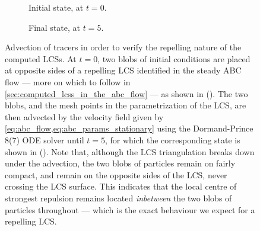 \begin{figure}[htpb]
    \centering
    \hspace*{\fill}
    \begin{subfigure}[b]{0.43\textwidth}
        \centering
        \caption[]{{\small Initial state, at $t=0$.}}
        \label{fig:blobtest-pre}
    \end{subfigure}\hfill%
    \begin{subfigure}[b]{0.43\textwidth}
        \centering
        \caption[]{{\small Final state, at $t=5$.}}
        \label{fig:blobtest-post}
    \end{subfigure}%
    \hspace*{\fill}
    \caption[Advection of tracers in order to verify the repelling nature of
    the computed \newline{}LCSs]
    {%
        Advection of tracers in order to verify the repelling nature of the
        computed LCSs. At $t=0$, two blobs of initial conditions are placed
        at opposite sides of a repelling LCS identified in the
        steady ABC flow --- more on which to follow in
        \cref{sec:computed_lcss_in_the_abc_flow} --- as shown in
        (). The two blobs, and the mesh points in
        the parametrization of the LCS, are then advected by the velocity
        field given by \cref{eq:abc_flow,eq:abc_params_stationary} using the
        Dormand-Prince 8(7) ODE solver until $t=5$, for which the corresponding
        state is shown in (). Note that, although
        the LCS triangulation breaks down under the advection, the two blobs
        of particles remain on fairly compact, and remain on the opposite
        sides of the LCS, never crossing the LCS surface. This indicates
        that the local centre of strongest repulsion remains located
        \emph{inbetween} the two blobs of particles throughout --- which
        is the exact behaviour we expect for a repelling LCS.
    }
    \label{fig:blobtest}
\end{figure}


